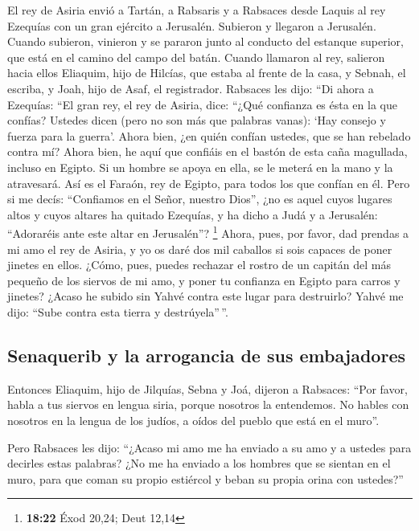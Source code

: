  El rey de Asiria envió a Tartán, a Rabsaris y a Rabsaces
desde Laquis al rey Ezequías con un gran ejército a Jerusalén. Subieron
y llegaron a Jerusalén. Cuando subieron, vinieron y se pararon junto al
conducto del estanque superior, que está en el camino del campo del
batán.  Cuando llamaron al rey, salieron hacia ellos
Eliaquim, hijo de Hilcías, que estaba al frente de la casa, y Sebnah, el
escriba, y Joah, hijo de Asaf, el registrador.  Rabsaces
les dijo: ``Di ahora a Ezequías: ``El gran rey, el rey de Asiria, dice:
``¿Qué confianza es ésta en la que confías?  Ustedes
dicen (pero no son más que palabras vanas): `Hay consejo y fuerza para
la guerra'. Ahora bien, ¿en quién confían ustedes, que se han rebelado
contra mí?  Ahora bien, he aquí que confiáis en el bastón
de esta caña magullada, incluso en Egipto. Si un hombre se apoya en
ella, se le meterá en la mano y la atravesará. Así es el Faraón, rey de
Egipto, para todos los que confían en él.  Pero si me
decís: ``Confiamos en el Señor, nuestro Dios'', ¿no es aquel cuyos
lugares altos y cuyos altares ha quitado Ezequías, y ha dicho a Judá y a
Jerusalén: ``Adoraréis ante este altar en Jerusalén''? \footnote{\textbf{18:22}
  Éxod 20,24; Deut 12,14}  Ahora, pues, por favor, dad
prendas a mi amo el rey de Asiria, y yo os daré dos mil caballos si sois
capaces de poner jinetes en ellos.  ¿Cómo, pues, puedes
rechazar el rostro de un capitán del más pequeño de los siervos de mi
amo, y poner tu confianza en Egipto para carros y jinetes?
 ¿Acaso he subido sin Yahvé contra este lugar para
destruirlo? Yahvé me dijo: ``Sube contra esta tierra y destrúyela''\,''.

\hypertarget{senaquerib-y-la-arrogancia-de-sus-embajadores}{%
\subsection{Senaquerib y la arrogancia de sus
embajadores}\label{senaquerib-y-la-arrogancia-de-sus-embajadores}}

 Entonces Eliaquim, hijo de Jilquías, Sebna y Joá,
dijeron a Rabsaces: ``Por favor, habla a tus siervos en lengua siria,
porque nosotros la entendemos. No hables con nosotros en la lengua de
los judíos, a oídos del pueblo que está en el muro''.

 Pero Rabsaces les dijo: ``¿Acaso mi amo me ha enviado a
su amo y a ustedes para decirles estas palabras? ¿No me ha enviado a los
hombres que se sientan en el muro, para que coman su propio estiércol y
beban su propia orina con ustedes?''

